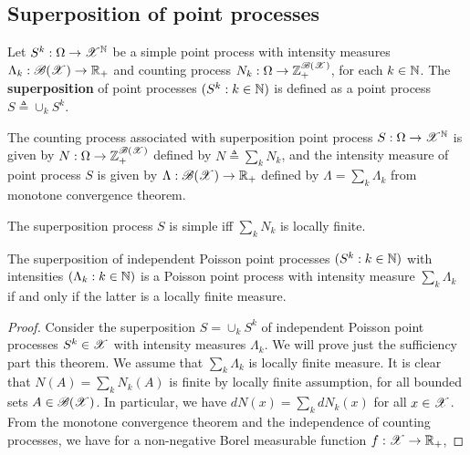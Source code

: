 \documentclass[a4paper,english,10pt]{article}
\begin{document}
\subsection{Superposition of point processes}
\begin{defn}
Let $S^k:\Omega\to\mathscr{X}^{\mathbb{N}}$ be a simple point process with intensity measures $\Lambda_k:\mathscr{B}(\mathscr{X})\to\mathbb{R}_+$ and counting process $N_k:\Omega\to\mathbb{Z}_+^{\mathscr{B}(\mathscr{X})}$, 
for each $k \in \mathbb{N}$. 
The \textbf{superposition} of point processes $(S^k: k \in \mathbb{N})$ is defined as a point process $S \triangleq \cup_kS^k$.
\end{defn}
\begin{rem} 
The counting process associated with superposition point process $S: \Omega\to\mathscr{X}^{\mathbb{N}}$ is given by $N: \Omega\to\mathbb{Z}_+^{\mathscr{B}(\mathscr{X})}$
defined by $N \triangleq \sum_kN_k$, 
and the intensity measure of point process $S$ is given by $\Lambda: \mathscr{B}(\mathscr{X})\to\mathbb{R}_+$ defined by $\Lambda = \sum_k\Lambda_k$ from monotone convergence theorem.
\end{rem}
\begin{rem}
The superposition process $S$ is simple iff $\sum_kN_k$ is locally finite.  
\end{rem}
\begin{thm}
The superposition of independent Poisson point processes $(S^k: k \in \mathbb{N})$ with intensities $(\Lambda_k: k \in \mathbb{N})$ 
is a Poisson point process with intensity measure $\sum_k \Lambda_k$ if and only if the latter is a locally finite measure.
\end{thm}
\begin{proof} 
Consider the superposition $S = \cup_kS^k$ of independent Poisson point processes $S^k \in \mathscr{X}$ with intensity measures $\Lambda_k$. 
We will prove just the sufficiency part this theorem. 
We assume that $\sum_k\Lambda_k$ is locally finite measure. 
It is clear that $N(A) = \sum_kN_k(A)$ is finite by locally finite assumption, for all bounded sets $A \in \mathscr{B}(\mathscr{X})$. 
In particular, we have $dN(x) = \sum_kdN_k(x)$ for all $x \in \mathscr{X}$.  
From the monotone convergence theorem and the independence of counting processes, 
we have for a non-negative Borel measurable function $f: \mathscr{X} \to \mathbb{R}_+$, 
\end{proof}
\end{document}
